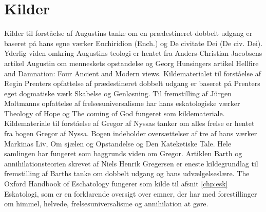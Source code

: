 \chapter{Kilder}
\label{chp:kilder}
Kilder til forståelse af Augustins tanke om en prædestineret dobbelt udgang er baseret på hans egne værker Enchiridion (Ench.) og De civitate Dei (De civ. Dei). Yderlig viden omkring Augustins teologi er hentet fra Anders-Christian Jacobsens artikel Augustin om menneskets opstandelse og Georg Hunsingers artikel Hellfire and Damnation: Four Ancient and Modern views. Kildematerialet til forståelse af Regin Prenters opfattelse af prædestineret dobbelt udgang er baseret på Prenters eget dogmatiske værk Skabelse og Genløsning. Til fremstilling af Jürgen Moltmanns opfattelse af frelsesuniversalisme har hans eskatologiske værker Theology of Hope og The coming of God fungeret som kildemateriale. Kildemateriale til forståelse af Gregor af Nyssas tanker om alles frelse er hentet fra bogen Gregor af Nyssa. Bogen indeholder oversættelser af tre af hans værker Markinas Liv, Om sjælen og Opstandelse og Den Kateketiske Tale. Hele samlingen har fungeret som baggrunds viden om Gregor. Artiklen Barth og annihilationsteorien skrevet af Niels Henrik Gregersen er eneste kildegrundlag til fremstilling af Barths tanke om dobbelt udgang og hans udvælgelseslære. The Oxford Handbook of Eschatology fungerer som kilde til afsnit \ref{chp:esk} Eskatologi, som er en forklarende oversigt over emner, der har med forestillinger om himmel, helvede, frelsesuniversalisme og annihilation at gøre.